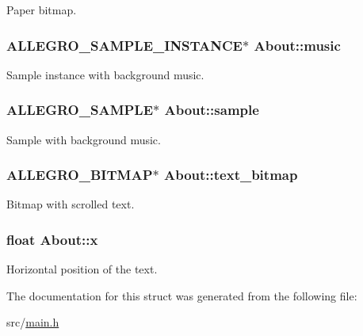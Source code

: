 \-Paper bitmap. \hypertarget{structAbout_a4c25f6cd85f909dca5325b8825eed16c}{
\subsubsection[{music}]{\setlength{\rightskip}{0pt plus 5cm}\-A\-L\-L\-E\-G\-R\-O\-\_\-\-S\-A\-M\-P\-L\-E\-\_\-\-I\-N\-S\-T\-A\-N\-C\-E$\ast$ {\bf \-About\-::music}}}\label{structAbout_a4c25f6cd85f909dca5325b8825eed16c}
\-Sample instance with background music. \hypertarget{structAbout_aaae3fb8b349d9973fde2156e1f86c75b}{
\subsubsection[{sample}]{\setlength{\rightskip}{0pt plus 5cm}\-A\-L\-L\-E\-G\-R\-O\-\_\-\-S\-A\-M\-P\-L\-E$\ast$ {\bf \-About\-::sample}}}\label{structAbout_aaae3fb8b349d9973fde2156e1f86c75b}
\-Sample with background music. \hypertarget{structAbout_a2e5dbd59393791949fd988de7b770f86}{
\subsubsection[{text\-\_\-bitmap}]{\setlength{\rightskip}{0pt plus 5cm}\-A\-L\-L\-E\-G\-R\-O\-\_\-\-B\-I\-T\-M\-A\-P$\ast$ {\bf \-About\-::text\-\_\-bitmap}}}\label{structAbout_a2e5dbd59393791949fd988de7b770f86}
\-Bitmap with scrolled text. \hypertarget{structAbout_a8ff1ed42ee1abd6ad45def77614015ce}{
\subsubsection[{x}]{\setlength{\rightskip}{0pt plus 5cm}float {\bf \-About\-::x}}}\label{structAbout_a8ff1ed42ee1abd6ad45def77614015ce}
\-Horizontal position of the text. 

\-The documentation for this struct was generated from the following file\-:\begin{DoxyCompactItemize}
\item 
src/\hyperlink{main_8h}{main.\-h}\end{DoxyCompactItemize}
